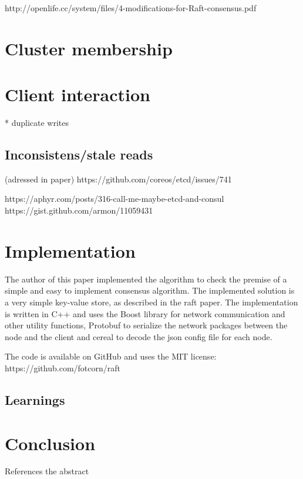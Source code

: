 http://openlife.cc/system/files/4-modifications-for-Raft-consensus.pdf

\section{Cluster membership}

\section{Client interaction}

* duplicate writes



\subsection{Inconsistens/stale reads}
(adressed in paper)
https://github.com/coreos/etcd/issues/741

https://aphyr.com/posts/316-call-me-maybe-etcd-and-consul
https://gist.github.com/armon/11059431

\section {Implementation}

The author of this paper implemented the algorithm to check the premise of a simple and easy to implement consensus algorithm. The implemented solution is a very simple key-value store, as described in the raft paper. The implementation is written in C++ and uses the Boost library for network communication and other utility functions, Protobuf to serialize the network packages between the node and the client and cereal to decode the json config file for each node.

The code is available on GitHub and uses the MIT license: https://github.com/fotcorn/raft

\subsection{Learnings}

\section{Conclusion}
References the abstract


